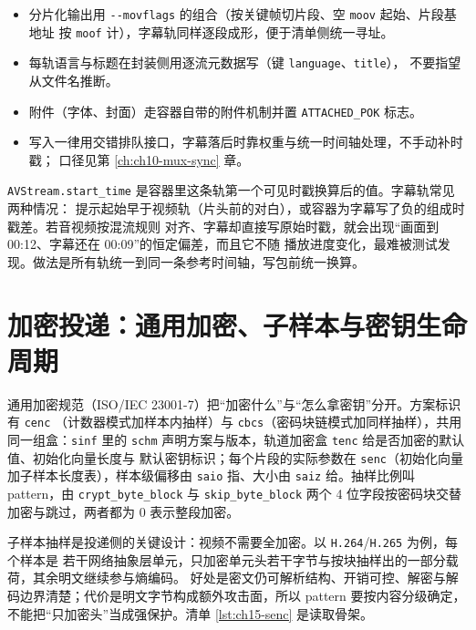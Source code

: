 \documentclass[12pt,a4paper,fontset=fandol]{ctexbook}
\newcommand{\Tp}[1]{\texttt{#1}}
\newcommand{\Opt}[1]{\texttt{-\/-#1}}
\newcommand{\Bk}{\discretionary{}{}{}}
\begin{document}
\begin{guideline}[title={封装字幕与图文轨时的四个开关}]
\begin{itemize}
\item 分片化输出用 \Opt{movflags} 的组合（按关键帧切片段、空 \Tp{moov} 起始、片段基地址
      按 \Tp{moof} 计），字幕轨同样逐段成形，便于清单侧统一寻址。
\item 每轨语言与标题在封装侧用逐流元数据写（键 \Tp{language}、\Tp{title}），
      不要指望从文件名推断。
\item 附件（字体、封面）走容器自带的附件机制并置 \Tp{ATTACHED\_POK} 标志。
\item 写入一律用交错排队接口，字幕落后时靠权重与统一时间轴处理，不手动补时戳；
      口径见第 \ref{ch:ch10-mux-sync} 章。
\end{itemize}
\end{guideline}

\begin{warning}[title={负偏移与 start\_time 的错配会整体推移字幕}]
\Tp{AVStream.start\_time} 是容器里这条轨第一个可见时戳换算后的值。字幕轨常见两种情况：
提示起始早于视频轨（片头前的对白），或容器为字幕写了负的组成时戳差。若音视频按混流规则
对齐、字幕却直接写原始时戳，就会出现``画面到 00:12、字幕还在 00:09''的恒定偏差，而且它不随
播放进度变化，最难被测试发现。做法是所有轨统一到同一条参考时间轴，写包前统一换算。
\end{warning}

\section{加密投递：通用加密、子样本与密钥生命周期}
\label{sec:ch15-encryption}

通用加密规范（ISO/IEC 23001-7）把``加密什么''与``怎么拿密钥''分开。方案标识有 \Tp{cenc}
（计数器模式加样本内抽样）与 \Tp{cbcs}（密码块链模式加同样抽样），共用同一组盒：\Tp{sinf}
里的 \Tp{schm} 声明方案与版本，轨道加密盒 \Tp{tenc} 给是否加密的默认值、初始化向量长度与
默认密钥标识；每个片段的实际参数在 \Tp{senc}（初始化向量加子样本长度表），样本级偏移由
\Tp{saio} 指、大小由 \Tp{saiz} 给。抽样比例叫 pattern，由 \Tp{crypt\_byte\_block} 与
\Tp{skip\_byte\_block} 两个 4 位字段按密码块交替加密与跳过，两者都为 0 表示整段加密。

子样本抽样是投递侧的关键设计：视频不需要全加密。以 \Tp{H.264}/{\Bk}\Tp{H.265} 为例，每个样本是
若干网络抽象层单元，只加密单元头若干字节与按块抽样出的一部分载荷，其余明文继续参与熵编码。
好处是密文仍可解析结构、开销可控、解密与解码边界清楚；代价是明文字节构成额外攻击面，所以
pattern 要按内容分级确定，不能把``只加密头''当成强保护。清单 \ref{lst:ch15-senc} 是读取骨架。
\end{document}
